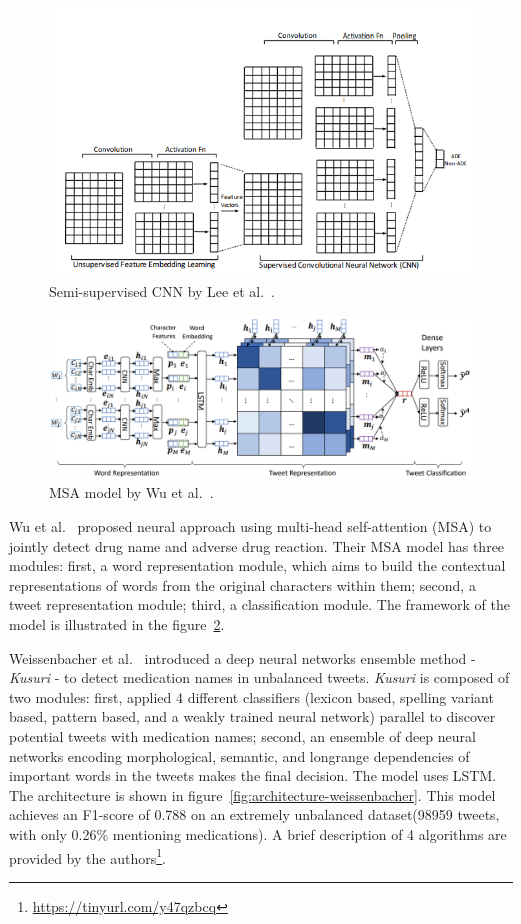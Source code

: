 \begin{figure}[h]
	\centering
	\includegraphics[width=0.99\linewidth]{Figures/l.png}
	\caption{Semi-supervised CNN by Lee et al.~\cite{lee2017adverse}.}
	\label{fig:architecture-lee}
\end{figure}

\begin{figure}[ht]
	\centering
	\includegraphics[width=0.99\linewidth]{Figures/k.png}
	\caption{MSA model by Wu et al.~\cite{wu2019msa}.}
	\label{fig:architecture-wu-msa}
\end{figure}

Wu et al.~\cite{wu2019msa} proposed neural approach using multi-head self-attention (MSA) to jointly detect drug name and adverse drug reaction. Their MSA model has three modules: first, a word representation module, which aims to build the contextual representations of words from the original characters within them; second, a tweet representation module; third, a classification module. The framework of the model is illustrated in the figure~\ref{fig:architecture-wu-msa}.

Weissenbacher et al.~\cite{weissenbacher2019deep} introduced a deep neural networks ensemble method - \textit{Kusuri} - to detect medication names in unbalanced tweets. \textit{Kusuri} is composed of two modules: first, applied 4 different classifiers (lexicon based, spelling variant based, pattern based, and a weakly trained neural network) parallel to discover potential tweets with medication names; second, an ensemble of deep neural networks encoding morphological, semantic, and longrange dependencies of important words in the tweets makes the final decision. The model uses LSTM. The architecture is shown in figure~\ref{fig:architecture-weissenbacher}. This model achieves an F1-score of 0.788 on an extremely unbalanced dataset(98959 tweets, with only 0.26\% mentioning medications). A brief description of 4 algorithms are provided by the authors\footnote{\url{https://tinyurl.com/y47qzbcq}}.

